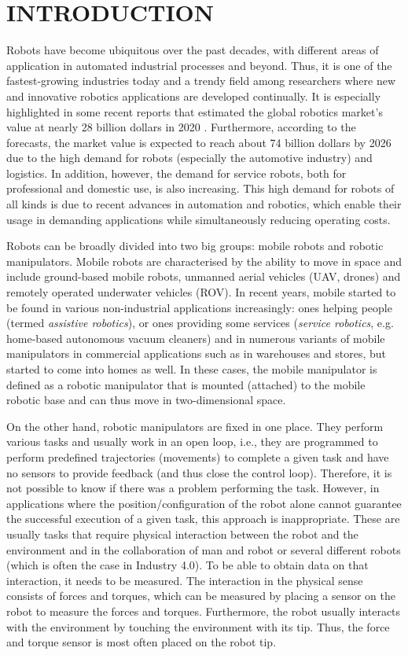 \chapter{INTRODUCTION}
\label{chap:Intro}

Robots have become ubiquitous over the past decades, with different areas of application in automated industrial processes and beyond. Thus, it is one of the fastest-growing industries today and a trendy field among researchers where new and innovative robotics applications are developed continually. It is especially highlighted in some recent reports that estimated the global robotics market's value at nearly 28 billion dollars in 2020 \cite{MordorIntelligence2020}. Furthermore, according to the forecasts, the market value is expected to reach about 74 billion dollars by 2026 due to the high demand for robots (especially the automotive industry) and logistics. In addition, however, the demand for service robots, both for professional and domestic use, is also increasing. This high demand for robots of all kinds is due to recent advances in automation and robotics, which enable their usage in demanding applications while simultaneously reducing operating costs.

Robots can be broadly divided into two big groups: mobile robots and robotic manipulators. Mobile robots are characterised by the ability to move in space and include ground-based mobile robots, unmanned aerial vehicles (UAV, drones) and remotely operated underwater vehicles (ROV). In recent years, mobile started to be found in various non-industrial applications increasingly: ones helping people (termed \emph{assistive robotics}), or ones providing some services (\emph{service robotics}, e.g. home-based autonomous vacuum cleaners) and in numerous variants of mobile manipulators in commercial applications such as in warehouses and stores, but started to come into homes as well. In these cases, the mobile manipulator is defined as a robotic manipulator that is mounted (attached) to the mobile robotic base and can thus move in two-dimensional space.

On the other hand, robotic manipulators are fixed in one place. They perform various tasks and usually work in an open loop, i.e., they are programmed to perform predefined trajectories (movements) to complete a given task and have no sensors to provide feedback (and thus close the control loop). Therefore, it is not possible to know if there was a problem performing the task. However, in applications where the position/configuration of the robot alone cannot guarantee the successful execution of a given task, this approach is inappropriate. These are usually tasks that require physical interaction between the robot and the environment and in the collaboration of man and robot or several different robots (which is often the case in Industry 4.0). To be able to obtain data on that interaction, it needs to be measured. The interaction in the physical sense consists of forces and torques, which can be measured by placing a sensor on the robot to measure the forces and torques. Furthermore, the robot usually interacts with the environment by touching the environment with its tip. Thus, the force and torque sensor is most often placed on the robot tip.


